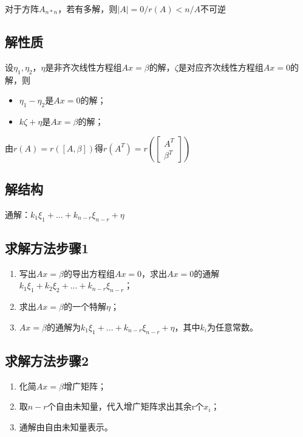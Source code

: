 对于方阵\(A_{n * n}\)，若有多解，则\(|A| = 0/r(A) < n/A\text{不可逆}\)
\mymatrix

\subsection{解性质}
设\(\eta_1, \eta_2\)，\(\eta\)是非齐次线性方程组\(Ax = \beta\)的解，\(\zeta\)是对应齐次线性方程组\(Ax = 0\)的解，则\begin{itemize}
    \item \(\eta_1 - \eta_2\)是\(Ax = 0\)的解；
    \item \(k\zeta + \eta\)是\(Ax = \beta\)的解；
\end{itemize}

由\(r(A) = r([A, \beta])\)得\(r(A^T) = r(\begin{bmatrix}
    A^T \\ 
    \beta^T
\end{bmatrix})\)

\subsection{解结构}
通解：\(k_1\xi_1 + ... + k_{n - r}\xi_{n - r} + \eta\)


\subsection{求解方法步骤1}
\begin{enumerate}
    \item 写出\(Ax = \beta\)的导出方程组\(Ax = 0\)，求出\(Ax = 0\)的通解\(k_1\xi_1 + k_2\xi_2 + ... + k_{n - r}\xi_{n - r}\)；
    \item 求出\(Ax = \beta\)的一个特解\(\eta\)；
    \item \(Ax = \beta\)的通解为\(k_1\xi_1 + ... + k_{n - r}\xi_{n - r} + \eta\)，其中\(k_i\)为任意常数。
\end{enumerate}


\subsection{求解方法步骤2}
\begin{enumerate}
    \item 化简\(Ax = \beta\)增广矩阵；
    \item 取\(n - r\)个自由未知量，代入增广矩阵求出其余r个\(x_i\)；
    \item 通解由自由未知量表示。
\end{enumerate}


